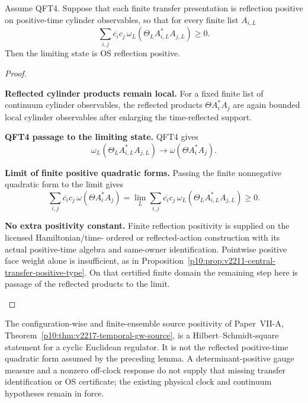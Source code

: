 \documentclass[12pt,a4paper]{article}
\begin{document}
\begin{lemma}
\label{p12:lem:rp-survives-limit}
Assume QFT4.  Suppose that each finite transfer presentation is reflection positive on positive-time cylinder observables, so that for every finite list \(A_{i,L}\)
\[
\sum_{i,j}\overline{c_i}c_j\,\omega_L(\Theta_LA_{i,L}^*A_{j,L})\ge0.
\]
Then the limiting state is OS reflection positive.
\end{lemma}
\begin{proof}
\begin{proofsteps}
\item \textbf{Reflected cylinder products remain local.}
For a fixed finite list of continuum cylinder observables, the reflected products \(\Theta A_i^*A_j\) are again bounded local cylinder observables after enlarging the time-reflected support.

\item \textbf{QFT4 passage to the limiting state.}
QFT4 gives
\[
\omega_L(\Theta_LA_{i,L}^*A_{j,L})\longrightarrow
\omega(\Theta A_i^*A_j).
\]

\item \textbf{Limit of finite positive quadratic forms.}
Passing the finite nonnegative quadratic form to the limit gives
\[
\sum_{i,j}\overline{c_i}c_j\,\omega(\Theta A_i^*A_j)
=
\lim_L
\sum_{i,j}\overline{c_i}c_j\,\omega_L(\Theta_LA_{i,L}^*A_{j,L})
\ge0.
\]

\item \textbf{No extra positivity constant.}
Finite reflection positivity is supplied on the licensed Hamiltonian/time-
ordered or reflected-action construction with its actual positive-time
algebra and same-owner identification. Pointwise positive face weight alone
is insufficient, as in Proposition~\ref{p10:prop:v2211-central-transfer-positive-type}.
On that certified finite domain the remaining step here is passage of the
reflected products to the limit.
\end{proofsteps}
\end{proof}

\begin{remark}
\label{p12:rem:v2217-gw-source-os-scope}
The configuration-wise and finite-ensemble source positivity of
Paper~VII-A, Theorem~\ref{p10:thm:v2217-temporal-gw-source}, is a
Hilbert--Schmidt-square statement for a cyclic Euclidean regulator.
It is not the reflected positive-time quadratic form assumed by the
preceding lemma. A determinant-positive gauge measure and a nonzero
off-clock response do not supply that missing transfer identification or
OS certificate; the existing physical clock and continuum hypotheses
remain in force.
\end{remark}
\end{document}
